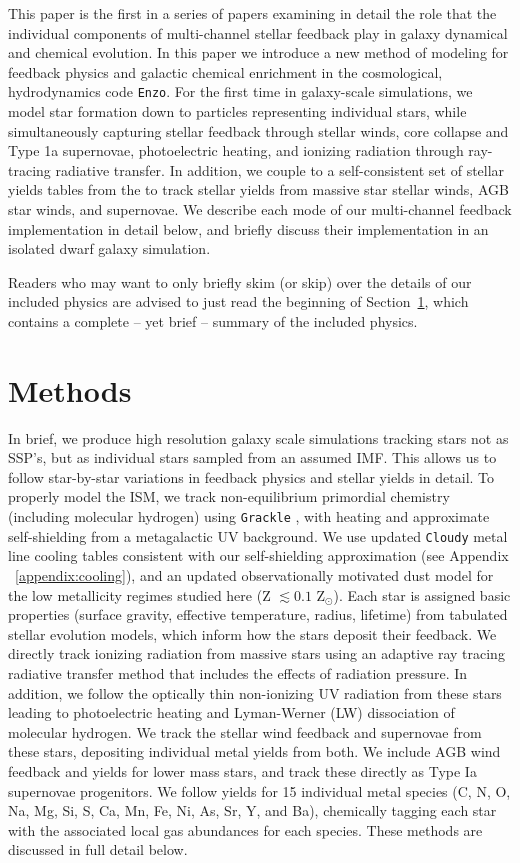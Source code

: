 \documentclass[twocolumn]{aastex61}
\begin{document}
This paper is the first in a series of papers examining in detail the role that the individual components of multi-channel stellar feedback play in galaxy dynamical and chemical evolution. In this paper we introduce a new method of modeling for feedback physics and galactic chemical enrichment in the cosmological, hydrodynamics code \texttt{Enzo}. For the first time in galaxy-scale simulations, we model star formation down to particles representing individual stars, while simultaneously capturing stellar feedback through stellar winds, core collapse and Type 1a supernovae, photoelectric heating, and ionizing radiation through ray-tracing radiative transfer. In addition, we couple to a self-consistent set of stellar yields tables from the to track stellar yields from massive star stellar winds, AGB star winds, and supernovae. We describe each mode of our multi-channel feedback implementation in detail below, and briefly discuss their implementation in an isolated dwarf galaxy simulation.

Readers who may want to only briefly skim (or skip) over the details of our included physics are advised to just read the beginning of Section~\ref{sec:methods}, which contains a complete -- yet brief -- summary of the included physics.

\section{Methods}
\label{sec:methods}
In brief, we produce high resolution galaxy scale simulations tracking stars not as SSP's, but as individual stars sampled from an assumed IMF.
This allows us to follow star-by-star variations in feedback physics and stellar yields in detail. To properly model the ISM, we track non-equilibrium primordial chemistry (including molecular hydrogen) using \texttt{Grackle} \citep{GrackleMethod}, with heating and approximate self-shielding from a metagalactic UV background. We use updated \texttt{Cloudy} metal line cooling tables consistent with our self-shielding approximation (see Appendix ~\ref{appendix:cooling}), and an updated observationally motivated dust model for the low metallicity regimes studied here (Z $\lesssim 0.1$ Z$_{\odot}$). Each star is assigned basic properties (surface gravity, effective temperature, radius, lifetime) from tabulated stellar evolution models, which inform how the stars deposit their feedback. We directly track ionizing radiation from massive stars using an adaptive ray tracing radiative transfer method that includes the effects of radiation pressure. In addition, we follow the optically thin non-ionizing UV radiation from these stars leading to photoelectric heating and Lyman-Werner (LW) dissociation of molecular hydrogen. We track the stellar wind feedback and supernovae from these stars, depositing individual metal yields from both. We include AGB wind feedback and yields for lower mass stars, and track these directly as Type Ia supernovae progenitors. We follow yields for 15 individual metal species (C, N, O, Na, Mg, Si, S, Ca, Mn, Fe, Ni, As, Sr, Y, and Ba), chemically tagging each star with the associated local gas abundances for each species. These methods are discussed in full detail below.
\end{document}
